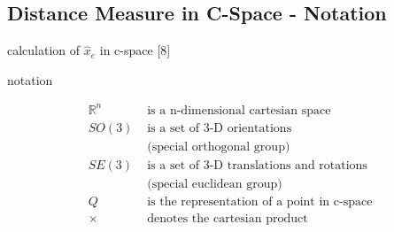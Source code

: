 \documentclass[%
  professionalfonts,%
  xcolor={%
    usenames,%
    dvipsnames,%
    svgnames,%
    table,%
    hyperref%
  }%
]{beamer}
\begin{document}
\subsection{Distance Measure in C-Space - Notation}
\begin{frame}
calculation of $\hat{x}_{e}$ in c-space [8]

notation

\begin{align*}
\mathbb{R}^{n} & \text{ is a n-dimensional cartesian space} \\
SO(3) & \text{ is a set of 3-D orientations} \\
& \text{ (special orthogonal group)} \\
SE(3) & \text{ is a set of 3-D translations and rotations} \\
& \text{ (special euclidean group)} \\
Q & \text{ is the representation of a point in c-space} \\
\times & \text{ denotes the cartesian product}
\end{align*}

\end{frame}
\end{document}
